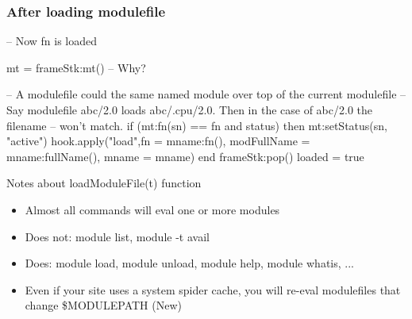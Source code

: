 \documentclass{beamer}
\begin{document}
\begin{frame}[fragile]
    \frametitle{After loading modulefile}
 {\tiny
    \begin{semiverbatim}
     -- Now fn is loaded 

     mt = frameStk:mt() -- Why?

     -- A modulefile could the same named module over top of the current modulefile
     -- Say modulefile abc/2.0 loads abc/.cpu/2.0.  Then in the case of abc/2.0 the filename
     -- won't match.
     if (mt:fn(sn) == fn and status) then
        mt:setStatus(sn, "active")
        hook.apply("load",{fn = mname:fn(), modFullName = mname:fullName(), mname = mname})
     end
     frameStk:pop()
     loaded = true
    \end{semiverbatim}
}
\end{frame}

\begin{frame}{Notes about loadModuleFile(t) function}
  \begin{itemize}
    \item Almost all commands will eval one or more modules
    \item Does not: module list, module -t avail
    \item Does:   module load, module unload, module help, module whatis, ...
    \item Even if your site uses a system spider cache, you will re-eval modulefiles that change \$MODULEPATH (New)
  \end{itemize}
\end{frame}
\end{document}
